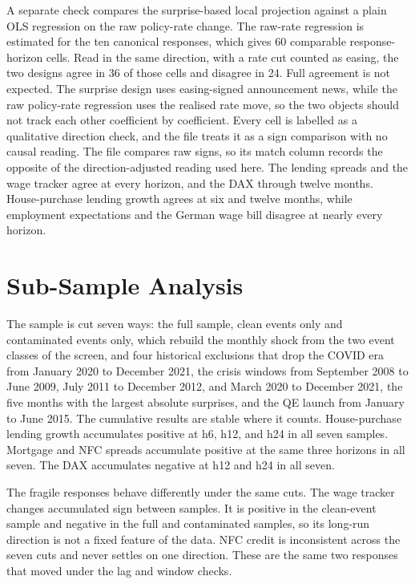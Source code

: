 A separate check compares the surprise-based local projection against a plain OLS regression on the raw policy-rate change. The raw-rate regression is estimated for the ten canonical responses, which gives 60 comparable response-horizon cells. Read in the same direction, with a rate cut counted as easing, the two designs agree in 36 of those cells and disagree in 24. Full agreement is not expected. The surprise design uses easing-signed announcement news, while the raw policy-rate regression uses the realised rate move, so the two objects should not track each other coefficient by coefficient. Every cell is labelled as a qualitative direction check, and the file treats it as a sign comparison with no causal reading. The file compares raw signs, so its match column records the opposite of the direction-adjusted reading used here. The lending spreads and the wage tracker agree at every horizon, and the DAX through twelve months. House-purchase lending growth agrees at six and twelve months, while employment expectations and the German wage bill disagree at nearly every horizon.

\section{Sub-Sample Analysis}
\label{sec:subsample-analysis}

The sample is cut seven ways: the full sample, clean events only and contaminated events only, which rebuild the monthly shock from the two event classes of the screen, and four historical exclusions that drop the COVID era from January 2020 to December 2021, the crisis windows from September 2008 to June 2009, July 2011 to December 2012, and March 2020 to December 2021, the five months with the largest absolute surprises, and the QE launch from January to June 2015. The cumulative results are stable where it counts. House-purchase lending growth accumulates positive at h6, h12, and h24 in all seven samples. Mortgage and NFC spreads accumulate positive at the same three horizons in all seven. The DAX accumulates negative at h12 and h24 in all seven.

The fragile responses behave differently under the same cuts. The wage tracker changes accumulated sign between samples. It is positive in the clean-event sample and negative in the full and contaminated samples, so its long-run direction is not a fixed feature of the data. NFC credit is inconsistent across the seven cuts and never settles on one direction. These are the same two responses that moved under the lag and window checks.

